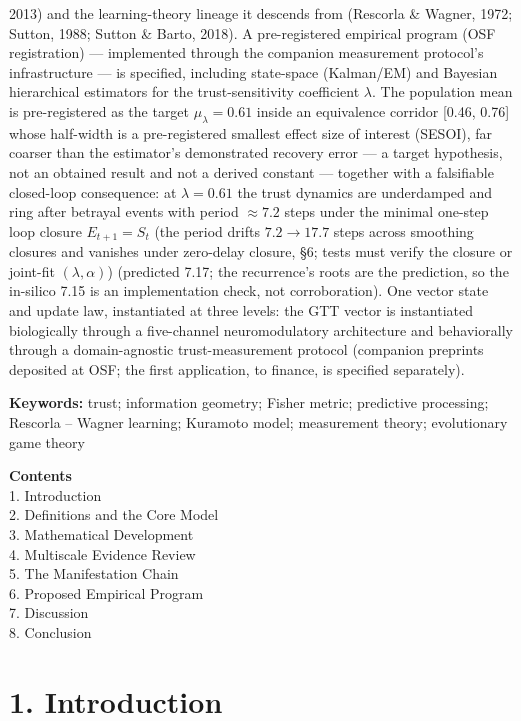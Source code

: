 \documentclass[
]{article}
\begin{document}
2013) and the learning-theory lineage it descends from (Rescorla \&
Wagner, 1972; Sutton, 1988; Sutton \& Barto, 2018). A pre-registered
empirical program (OSF registration) --- implemented through the
companion measurement protocol's infrastructure --- is specified,
including state-space (Kalman/EM) and Bayesian hierarchical estimators
for the trust-sensitivity coefficient \(\lambda.\) The population mean
is pre-registered as the target \(\mu_\lambda = 0.61\) inside an
equivalence corridor {[}0.46, 0.76{]} whose half-width is a
pre-registered smallest effect size of interest (SESOI), far coarser
than the estimator's demonstrated recovery error --- a target
hypothesis, not an obtained result and not a derived constant ---
together with a falsifiable closed-loop consequence: at
\(\lambda = 0.61\) the trust dynamics are underdamped and ring after
betrayal events with period \(\approx 7.2\) steps under the minimal
one-step loop closure \(E_{t+1} = S_t\) (the period drifts
\(7.2 \to 17.7\) steps across smoothing closures and vanishes under
zero-delay closure, §6; tests must verify the closure or joint-fit
\((\lambda, \alpha)\)) (predicted 7.17; the recurrence's roots are the
prediction, so the in-silico 7.15 is an implementation check, not
corroboration). One vector state and update law, instantiated at three
levels: the GTT vector is instantiated biologically through a
five-channel neuromodulatory architecture and behaviorally through a
domain-agnostic trust-measurement protocol (companion preprints
deposited at OSF; the first application, to finance, is specified
separately).

\textbf{Keywords:} trust; information geometry; Fisher metric;
predictive processing; Rescorla -- Wagner learning; Kuramoto model;
measurement theory; evolutionary game theory

\textbf{Contents}\\
1. Introduction\\
2. Definitions and the Core Model\\
3. Mathematical Development\\
4. Multiscale Evidence Review\\
5. The Manifestation Chain\\
6. Proposed Empirical Program\\
7. Discussion\\
8. Conclusion\\

\section{1. Introduction}\label{introduction}
\end{document}
